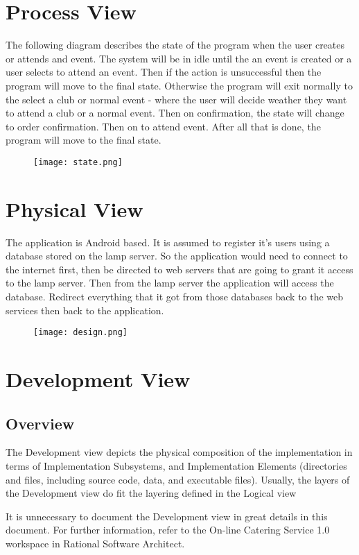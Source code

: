 \documentclass[10pt,a4paper]{article}
\begin{document}
\section{Process View}
The following diagram describes the state of the program when the user creates or attends and event. The system will be in idle until the an event is created or a user selects to attend an event. Then if the action is unsuccessful then the program will move to the final state. Otherwise the program will exit normally to the select a club or normal event - where the user will decide weather they want to attend a club or a normal event. Then on confirmation, the state will change to order confirmation. Then on to attend event. After all that is done, the program will move to the final state.
\begin{figure}[H]
\texttt{[image: state.png]}
\end{figure}

\section{Physical View}

The application is Android based. It is assumed to register it's users using a database stored on the lamp server. So the application would need to connect to the internet first, then be directed to web servers that are going to grant it access to the lamp server. Then from the lamp server the application will access the database. Redirect everything that it got from those databases back to the web services then back to the application.
\begin{figure}[H]
\texttt{[image: design.png]}
\end{figure}

\section{Development  View} 
\subsection{ Overview}

The Development view depicts the physical composition of the implementation in terms of Implementation Subsystems, and Implementation Elements (directories and files, including source code, data, and executable files). 
Usually, the layers of the Development view do fit the layering defined in the Logical view

It is unnecessary to document the Development view in great details in this document. For further information, refer to the On-line Catering Service 1.0 workspace in Rational Software Architect. 
\end{document}
